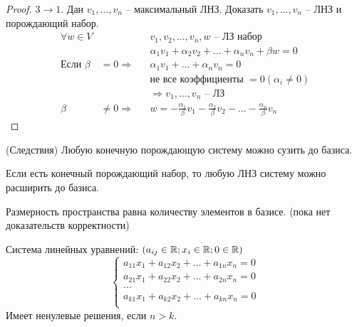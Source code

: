 \begin{proof}
    $3 \to 1$. Дан $v_1, ..., v_n$ -- максимальный ЛНЗ.
    Доказать $v_1, ..., v_n$ -- ЛНЗ и порождающий набор.
    \begin{align*}
        \forall w \in V  &                 &  & v_1, v_2, ..., v_n, w \text{ -- ЛЗ набор} \\
                           &                 &  & \alpha_1 v_1 + \alpha_2 v_2 + ...
        + \alpha_n v_n +\beta w = 0                                                           \\
        \text{Если } \beta & = 0 \Rightarrow    &  & \alpha_1 v_1 + ... + \alpha_n v_n =0        \\
                           &                 &  & \text{не все коэффициенты } = 0 (\alpha_i \neq 0) \\
                           &                 &  & \Rightarrow v_1,..., v_n \text{ -- ЛЗ}           \\
        \beta              & \neq 0 \Rightarrow &  & w = - \frac{\alpha_1}{\beta} v_1
        - \frac{\alpha_2}{\beta} v_2 - ...  - \frac{\alpha_n}{\beta} v_n
    \end{align*} 
\end{proof}

\begin{remark} (Следствия)
    Любую конечную порождающую систему можно сузить до базиса.

    Если есть конечный порождающий набор, то любую ЛНЗ систему можно расширить
    до базиса.
\end{remark}

\begin{definition}
    Размерность пространства равна количеству элементов в базисе.
    (пока нет доказательств корректности)
\end{definition}

\begin{lemma}
    Система линейных уравнений: $(a_{ij} \in \mathbb{R}; x_i \in \mathbb{R}; 0 \in \mathbb{R})$
    \begin{equation*}
        \begin{cases}
            a_{11} x_1 + a_{12}x_2 + ... + a_{1n} x_n = 0 \\
            a_{21} x_1 + a_{22}x_2 + ... + a_{2n} x_n = 0 \\
            ...                                           \\
            a_{k1} x_1 + a_{k2}x_2 + ... + a_{kn} x_n = 0 \\
        \end{cases}
    \end{equation*}
    Имеет ненулевые решения, если $n>k$.
\end{lemma}

